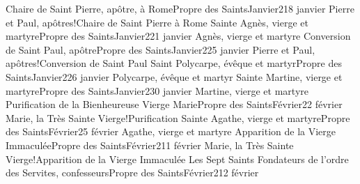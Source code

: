 \documentclass[twoside, french]{book}
\begin{document}
        {Chaire de Saint Pierre, apôtre, à Rome}{Propre des Saints}{Janvier}{2}{18 janvier}
        {}{}{Pierre et Paul, apôtres!Chaire de Saint Pierre à Rome}{}{}
        {Sainte Agnès, vierge et martyre}{Propre des Saints}{Janvier}{2}{21 janvier}
        {}{}{Agnès, vierge et martyre}{}{}
        {Conversion de Saint Paul, apôtre}{Propre des Saints}{Janvier}{2}{25 janvier}
        {}{}{Pierre et Paul, apôtres!Conversion de Saint Paul}{}{}
        {Saint Polycarpe, évêque et martyr}{Propre des Saints}{Janvier}{2}{26 janvier}
        {}{}{Polycarpe, évêque et martyr}{}{}
        {Sainte Martine, vierge et martyre}{Propre des Saints}{Janvier}{2}{30 janvier}
        {}{}{Martine, vierge et martyre}{}{}
        {Purification de la Bienheureuse Vierge Marie}{Propre des Saints}{Février}{2}{2 février}
        {}{}{Marie, la Très Sainte Vierge!Purification}{}{}
        {Sainte Agathe, vierge et martyre}{Propre des Saints}{Février}{2}{5 février}
        {}{}{Agathe, vierge et martyre}{}{}
        {Apparition de la Vierge Immaculée}{Propre des Saints}{Février}{2}{11 février}
        {}{}{Marie, la Très Sainte Vierge!Apparition de la Vierge Immaculée}{}{}
        {Les Sept Saints Fondateurs de l’ordre des Servites, confesseurs}{Propre des Saints}{Février}{2}{12 février}
\end{document}
